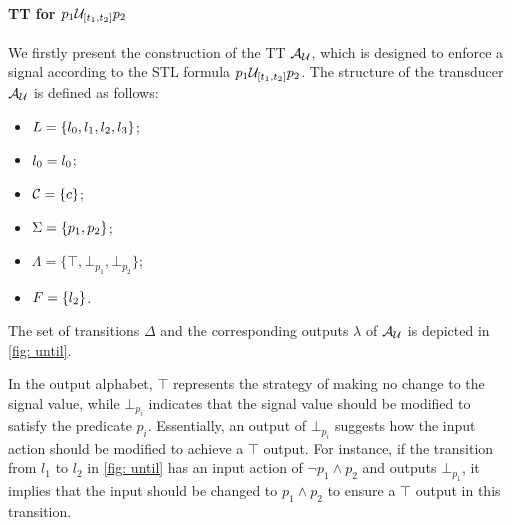         \paragraph{TT for $p_1\until_{[t_1,t_2]}p_2$} We firstly present the construction of the TT \( \automaton_{\until} \), which is designed to enforce a signal according to the STL formula \( p_1 \until_{[t_1, t_2]} p_2 \). The structure of the transducer \( \automaton_{\until} \) is defined as follows:
        \begin{itemize}
            \item $L=\{l_0, l_1, l_2, l_3\}$; 
            \item $l_0=l_0$;
            \item $\mathcal{C}=\{c\}$;
            \item $\Sigma= \{p_1,p_2\}$;
            \item $\Lambda = \{\top, \bot_{p_1}, \bot_{p_2} \}$;
            \item $F=\{l_2\}$.
        \end{itemize}
        
        The set of transitions $\Delta$ and the corresponding outputs $\lambda$ of \(\automaton_{\until}\) is depicted in \cref{fig: until}. 
        
        In the output alphabet, \(\top\) represents the strategy of making no change to the signal value, while \(\bot_{p_i}\) indicates that the signal value should be modified to satisfy the predicate \(p_i\). Essentially, an output of \(\bot_{p_i}\) suggests how the input action should be modified to achieve a \(\top\) output. For instance, if the transition from \(l_1\) to \(l_2\) in \cref{fig: until} has an input action of \(\neg p_1 \land p_2\) and outputs \(\bot_{p_1}\), it implies that the input should be changed to \(p_1 \land p_2\) to ensure a \(\top\) output in this transition.
        
